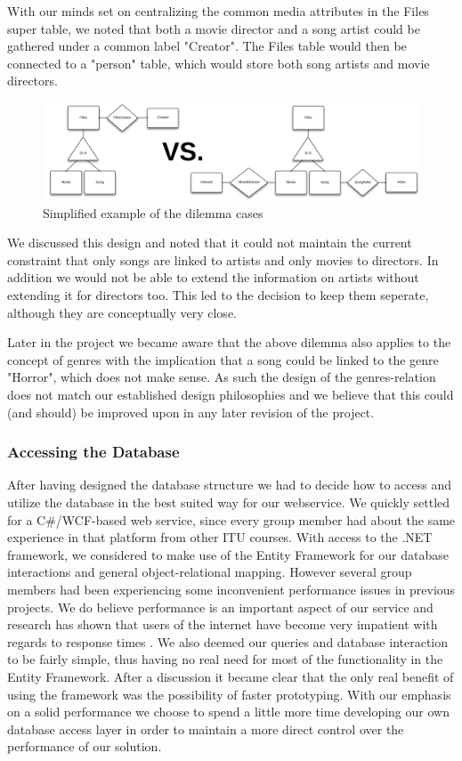 With our minds set on centralizing the common media attributes in the Files super table, we noted that both a movie director and a song artist could be gathered under a common label "Creator". The Files table would then be connected to a "person" table, which would store both song artists and movie directors.
\begin{figure}[h]
	\centering
	\centerline{\includegraphics[scale=0.52]{./p1design/dilemma.png}}
	\caption{Simplified example of the dilemma cases}
	\label{fig:erddilemma}
\end{figure}

We discussed this design and noted that it could not maintain the current constraint that only songs are linked to artists and only movies to directors. In addition we would not be able to extend the information on artists without extending it for directors too. This led to the decision to keep them seperate, although they are conceptually very close.

Later in the project we became aware that the above dilemma also applies to the concept of genres with the implication that a song could be linked to the genre "Horror", which does not make sense. As such the design of the genres-relation does not match our established design philosophies and we believe that this could (and should) be improved upon in any later revision of the project.

\subsubsection{Accessing the Database}
\label{sec:databaseaccess}
After having designed the database structure we had to decide how to access and utilize the database in the best suited way for our webservice. We quickly settled for a C\#/WCF-based web service, since every group member had about the same experience in that platform from other ITU courses.
With access to the .NET framework, we considered to make use of the Entity Framework for our database interactions and general object-relational mapping. However several group members had been experiencing some inconvenient performance issues in previous projects. We do believe performance is an important aspect of our service and research has shown that users of the internet have become very impatient with regards to response times \cite{webusersflee}. We also deemed our queries and database interaction to be fairly simple, thus having no real need for most of the functionality in the Entity Framework. After a discussion it became clear that the only real benefit of using the framework was the possibility of faster prototyping. With our emphasis on a solid performance we choose to spend a little more time developing our own database access layer in order to maintain a more direct control over the performance of our solution.


